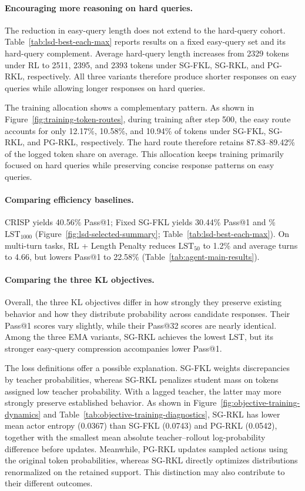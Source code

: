 \paragraph{Encouraging more reasoning on hard queries.}
The reduction in easy-query length does not extend to the hard-query cohort. Table~\ref{tab:lsd-best-each-max} reports results on a fixed easy-query set and its hard-query complement. Average hard-query length increases from 2329 tokens under RL to 2511, 2395, and 2393 tokens under SG-FKL, SG-RKL, and PG-RKL, respectively. All three variants therefore produce shorter responses on easy queries while allowing longer responses on hard queries.

The training allocation shows a complementary pattern. As shown in Figure~\ref{fig:training-token-routes}, during training after step 500, the easy route accounts for only 12.17\%, 10.58\%, and 10.94\% of tokens under SG-FKL, SG-RKL, and PG-RKL, respectively. The hard route therefore retains 87.83--89.42\% of the logged token share on average. This allocation keeps training primarily focused on hard queries while preserving concise response patterns on easy queries.

\paragraph{Comparing efficiency baselines.}
CRISP yields 40.56\% Pass@1; Fixed SG-FKL yields 30.44\% Pass@1 and \mainLSTFixedShort\% $\mathrm{LST}_{1000}$ (Figure~\ref{fig:lsd-selected-summary}; Table~\ref{tab:lsd-best-each-max}). On multi-turn tasks, RL + Length Penalty reduces $\mathrm{LST}_{50}$ to 1.2\% and average turns to 4.66, but lowers Pass@1 to 22.58\% (Table~\ref{tab:agent-main-results}).

\paragraph{Comparing the three KL objectives.}
Overall, the three KL objectives differ in how strongly they preserve existing behavior and how they distribute probability across candidate responses. Their Pass@1 scores vary slightly, while their Pass@32 scores are nearly identical. Among the three EMA variants, SG-RKL achieves the lowest LST, but its stronger easy-query compression accompanies lower Pass@1.

The loss definitions offer a possible explanation. SG-FKL weights discrepancies by teacher probabilities, whereas SG-RKL penalizes student mass on tokens assigned low teacher probability. With a lagged teacher, the latter may more strongly preserve established behavior. As shown in Figure~\ref{fig:objective-training-dynamics} and Table~\ref{tab:objective-training-diagnostics}, SG-RKL has lower mean actor entropy (0.0367) than SG-FKL (0.0743) and PG-RKL (0.0542), together with the smallest mean absolute teacher--rollout log-probability difference before updates. Meanwhile, PG-RKL updates sampled actions using the original token probabilities, whereas SG-RKL directly optimizes distributions renormalized on the retained support. This distinction may also contribute to their different outcomes.

